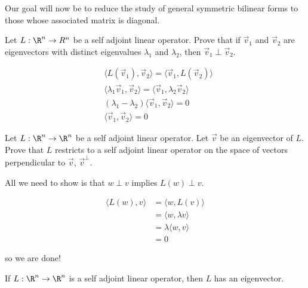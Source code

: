 \documentclass{ximera}
\begin{document}
Our goal will now be to reduce the study of general symmetric bilinear forms to those whose associated matrix is diagonal.

	Let $L: \R^n \to R^n$ be a self adjoint linear operator.  Prove that if $\vec{v}_1$ and $\vec{v}_2$ are eigenvectors with 
	distinct eigenvalues $\lambda_1$  and $\lambda_2$, then $\vec{v}_1 \perp \vec{v}_2$.
\begin{free-response}
	\begin{align*}
		&\langle  L(\vec{v}_1), \vec{v}_2 \rangle = \langle \vec{v}_1  ,L(\vec{v}_2)\rangle\\
		&\langle \lambda_1\vec{v}_1, \vec{v}_2\rangle = \langle  \vec{v}_1,\lambda_2 \vec{v}_2\rangle\\
		& (\lambda_1 - \lambda_2)\langle \vec{v}_1,\vec{v}_2\rangle =0\\
		&\langle \vec{v}_1,\vec{v}_2\rangle = 0
	\end{align*}
\end{free-response}

	Let $L:\R^n \to \R^n$ be a self adjoint linear operator.  Let $\vec{v}$ be an eigenvector of $L$.  Prove that $L$ restricts to a self adjoint linear operator
	on the space of vectors perpendicular to $\vec{v}$,  $\vec{v}^\perp$.  

\begin{free-response}
	All we need to show is that $w \perp v$ implies $L(w) \perp v$.
	
	\begin{align*}
		\langle  L(w), v \rangle &= \langle w, L(v)\rangle\\
			&= \langle  w, \lambda v\rangle\\
			&=\lambda \langle w, v \rangle\\
			&=0
	\end{align*}
	
	so we are done!
\end{free-response}

\begin{theorem}
	If $L: \R^n \to \R^n$ is a self adjoint linear operator, then $L$ has an eigenvector.
\end{theorem}
\end{document}
